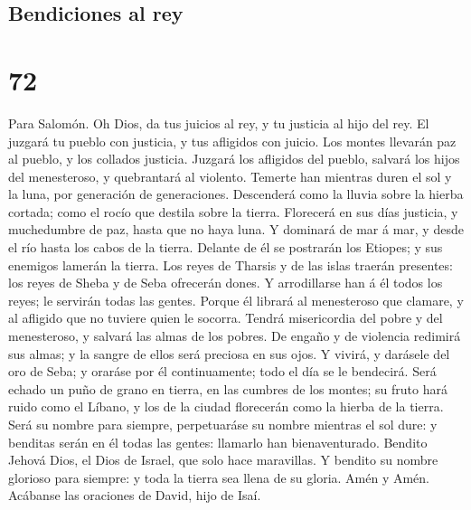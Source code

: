 \hypertarget{bendiciones-al-rey}{%
\subsection{Bendiciones al rey}\label{bendiciones-al-rey}}

\hypertarget{section-71}{%
\section{72}\label{section-71}}

 Para Salomón. Oh Dios, da tus juicios al rey, y tu
justicia al hijo del rey.  El juzgará tu pueblo con
justicia, y tus afligidos con juicio.  Los montes llevarán
paz al pueblo, y los collados justicia.  Juzgará los
afligidos del pueblo, salvará los hijos del menesteroso, y quebrantará
al violento.  Temerte han mientras duren el sol y la luna,
por generación de generaciones.  Descenderá como la lluvia
sobre la hierba cortada; como el rocío que destila sobre la tierra.
 Florecerá en sus días justicia, y muchedumbre de paz,
hasta que no haya luna.  Y dominará de mar á mar, y desde
el río hasta los cabos de la tierra.  Delante de él se
postrarán los Etiopes; y sus enemigos lamerán la tierra. 
Los reyes de Tharsis y de las islas traerán presentes: los reyes de
Sheba y de Seba ofrecerán dones.  Y arrodillarse han á él
todos los reyes; le servirán todas las gentes.  Porque él
librará al menesteroso que clamare, y al afligido que no tuviere quien
le socorra.  Tendrá misericordia del pobre y del
menesteroso, y salvará las almas de los pobres.  De
engaño y de violencia redimirá sus almas; y la sangre de ellos será
preciosa en sus ojos.  Y vivirá, y darásele del oro de
Seba; y oraráse por él continuamente; todo el día se le bendecirá.
 Será echado un puño de grano en tierra, en las cumbres
de los montes; su fruto hará ruido como el Líbano, y los de la ciudad
florecerán como la hierba de la tierra.  Será su nombre
para siempre, perpetuaráse su nombre mientras el sol dure: y benditas
serán en él todas las gentes: llamarlo han bienaventurado.
 Bendito Jehová Dios, el Dios de Israel, que solo hace
maravillas.  Y bendito su nombre glorioso para siempre: y
toda la tierra sea llena de su gloria. Amén y Amén. 
Acábanse las oraciones de David, hijo de Isaí.

